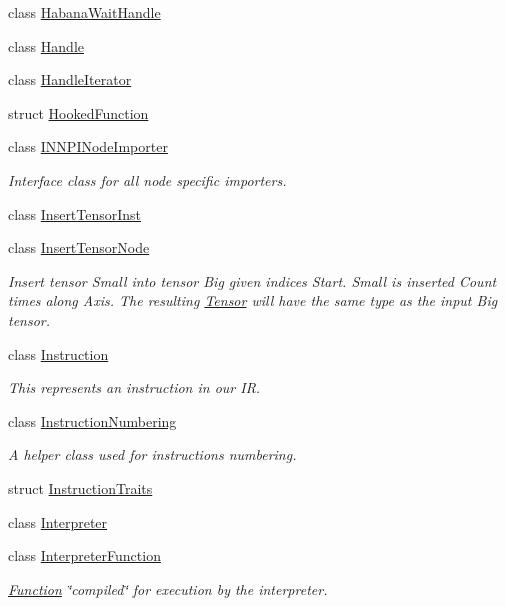 \begin{DoxyCompactItemize}
class \hyperlink{classglow_1_1_habana_wait_handle}{Habana\+Wait\+Handle}
\item 
class \hyperlink{classglow_1_1_handle}{Handle}
\item 
class \hyperlink{classglow_1_1_handle_iterator}{Handle\+Iterator}
\item 
struct \hyperlink{structglow_1_1_hooked_function}{Hooked\+Function}
\item 
class \hyperlink{classglow_1_1_i_n_n_p_i_node_importer}{I\+N\+N\+P\+I\+Node\+Importer}
\begin{DoxyCompactList}\small\item\em Interface class for all node specific importers. \end{DoxyCompactList}\item 
class \hyperlink{classglow_1_1_insert_tensor_inst}{Insert\+Tensor\+Inst}
\item 
class \hyperlink{classglow_1_1_insert_tensor_node}{Insert\+Tensor\+Node}
\begin{DoxyCompactList}\small\item\em Insert tensor Small into tensor Big given indices Start. Small is inserted Count times along Axis. The resulting \hyperlink{classglow_1_1_tensor}{Tensor} will have the same type as the input Big tensor. \end{DoxyCompactList}\item 
class \hyperlink{classglow_1_1_instruction}{Instruction}
\begin{DoxyCompactList}\small\item\em This represents an instruction in our IR. \end{DoxyCompactList}\item 
class \hyperlink{classglow_1_1_instruction_numbering}{Instruction\+Numbering}
\begin{DoxyCompactList}\small\item\em A helper class used for instructions numbering. \end{DoxyCompactList}\item 
struct \hyperlink{structglow_1_1_instruction_traits}{Instruction\+Traits}
\item 
class \hyperlink{classglow_1_1_interpreter}{Interpreter}
\item 
class \hyperlink{classglow_1_1_interpreter_function}{Interpreter\+Function}
\begin{DoxyCompactList}\small\item\em \hyperlink{classglow_1_1_function}{Function} \char`\"{}compiled\char`\"{} for execution by the interpreter. \end{DoxyCompactList}\item 

\end{DoxyCompactItemize}
